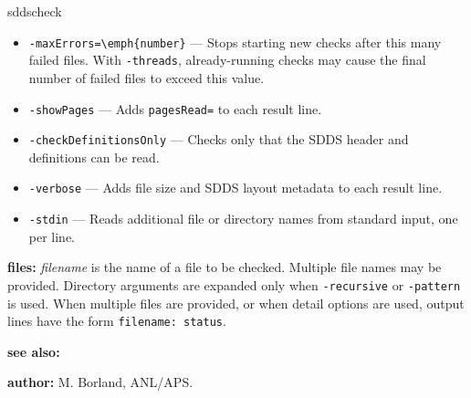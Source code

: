 \begin{sddsprog}{sddscheck}
\begin{itemize}
      \item \verb|-maxErrors=\emph{number}| --- Stops starting new checks after this many failed files. With \verb|-threads|, already-running checks may cause the final number of failed files to exceed this value.
      \item \verb|-showPages| --- Adds \verb|pagesRead=| to each result line.
      \item \verb|-checkDefinitionsOnly| --- Checks only that the SDDS header and definitions can be read.
      \item \verb|-verbose| --- Adds file size and SDDS layout metadata to each result line.
      \item \verb|-stdin| --- Reads additional file or directory names from standard input, one per line.
    \end{itemize}
  \item \textbf{files:} \emph{filename} is the name of a file to be checked. Multiple file names may be provided. Directory arguments are expanded only when \verb|-recursive| or \verb|-pattern| is used. When multiple files are provided, or when detail options are used, output lines have the form \verb|filename: status|.
  \item \textbf{see also:} 
  \item \textbf{author:} M. Borland, ANL/APS.
\end{sddsprog}
